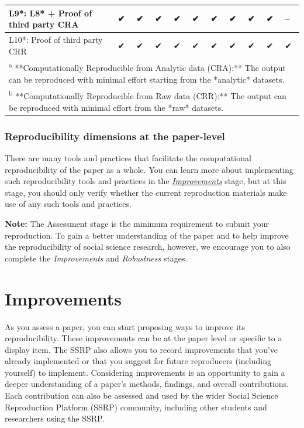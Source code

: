 \documentclass[
]{book}
\begin{document}
\begin{table}
\begin{tabular}[t]{l|l|l|l|l|l|l|l|l|l|l}
\hline
L9*: L8* + Proof of third party CRA & ✔ & ✔ & ✔ & ✔ & ✔ & ✔ & ✔ & ✔ & ✔ & --\\
\hline
L10*: Proof of third party CRR & ✔ & ✔ & ✔ & ✔ & ✔ & ✔ & ✔ & ✔ & ✔ & ✔\\
\hline
\multicolumn{11}{l}{\textsuperscript{a} **Computationally Reproducible from Analytic data (CRA):** The output can be reproduced with minimal effort starting from the *analytic* datasets.}\\
\multicolumn{11}{l}{\textsuperscript{b} **Computationally Reproducible from Raw data (CRR):** The output can be reproduced with minimal effort from the *raw* datasets.}\\
\end{tabular}
\end{table}

\hypertarget{reproducibility-dimensions-at-the-paper-level}{%
\subsection{Reproducibility dimensions at the paper-level}\label{reproducibility-dimensions-at-the-paper-level}}

There are many tools and practices that facilitate the computational reproducibility of the paper as a whole. You can learn more about implementing such reproducibility tools and practices in the \href{https://bitss.github.io/ACRE/improvements.html}{\emph{Improvements}} stage, but at this stage, you should only verify whether the current reproduction materials make use of any such tools and practices.

\textbf{Note:} The Assessment stage is the minimum requirement to submit your reproduction. To gain a better understanding of the paper and to help improve the reproducibility of social science research, however, we encourage you to also complete the \emph{Improvements} and \emph{Robustness} stages.

\hypertarget{improvements}{%
\chapter{Improvements}\label{improvements}}

As you assess a paper, you can start proposing ways to improve its reproducibility. These improvements can be at the paper level or specific to a display item. The SSRP also allows you to record improvements that you've already implemented or that you suggest for future reproducers (including yourself) to implement. Considering improvements is an opportunity to gain a deeper understanding of a paper's methods, findings, and overall contributions. Each contribution can also be assessed and used by the wider Social Science Reproduction Platform (SSRP) community, including other students and researchers using the SSRP.
\end{document}
